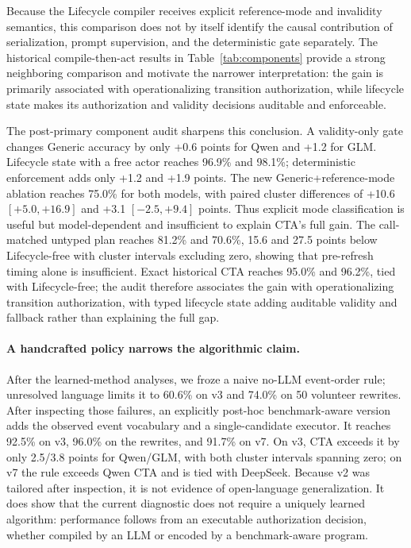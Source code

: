 \documentclass[letterpaper]{article}
\begin{document}
Because the Lifecycle compiler receives explicit reference-mode and invalidity semantics, this
comparison does not by itself identify the causal contribution of serialization, prompt
supervision, and the deterministic gate separately. The historical compile-then-act results in
Table~\ref{tab:components} provide a strong neighboring comparison and motivate the narrower
interpretation: the gain is primarily associated with operationalizing transition authorization, while
lifecycle state makes its authorization and validity decisions auditable and enforceable.

The post-primary component audit sharpens this conclusion. A validity-only gate changes
Generic accuracy by only +0.6 points for Qwen and +1.2 for GLM. Lifecycle state with a free
actor reaches 96.9\% and 98.1\%; deterministic enforcement adds only +1.2 and +1.9 points.
The new Generic+reference-mode ablation reaches 75.0\% for both models, with paired cluster
differences of +10.6 $[+5.0,+16.9]$ and +3.1 $[-2.5,+9.4]$ points. Thus explicit mode
classification is useful but model-dependent and insufficient to explain CTA's full gain.
The call-matched untyped plan reaches 81.2\% and 70.6\%, 15.6 and 27.5 points below
Lifecycle-free with cluster intervals excluding zero, showing that pre-refresh timing alone is
insufficient. Exact historical CTA reaches 95.0\% and 96.2\%, tied with Lifecycle-free; the
audit therefore associates the gain with operationalizing transition authorization, with typed
lifecycle state adding auditable validity and fallback rather than explaining the full gap.

\paragraph{A handcrafted policy narrows the algorithmic claim.}
After the learned-method analyses, we froze a naive no-LLM event-order rule; unresolved language
limits it to 60.6\% on v3 and 74.0\% on 50 volunteer rewrites. After inspecting those failures,
an explicitly post-hoc benchmark-aware version adds the observed event vocabulary and a
single-candidate executor. It reaches 92.5\% on v3, 96.0\% on the rewrites, and 91.7\% on v7.
On v3, CTA exceeds it by only 2.5/3.8 points for Qwen/GLM, with both cluster intervals spanning
zero; on v7 the rule exceeds Qwen CTA and is tied with DeepSeek. Because v2 was tailored after
inspection, it is not evidence of open-language generalization. It does show that the current
diagnostic does not require a uniquely learned algorithm: performance follows from an executable
authorization decision, whether compiled by an LLM or encoded by a benchmark-aware program.
\end{document}
